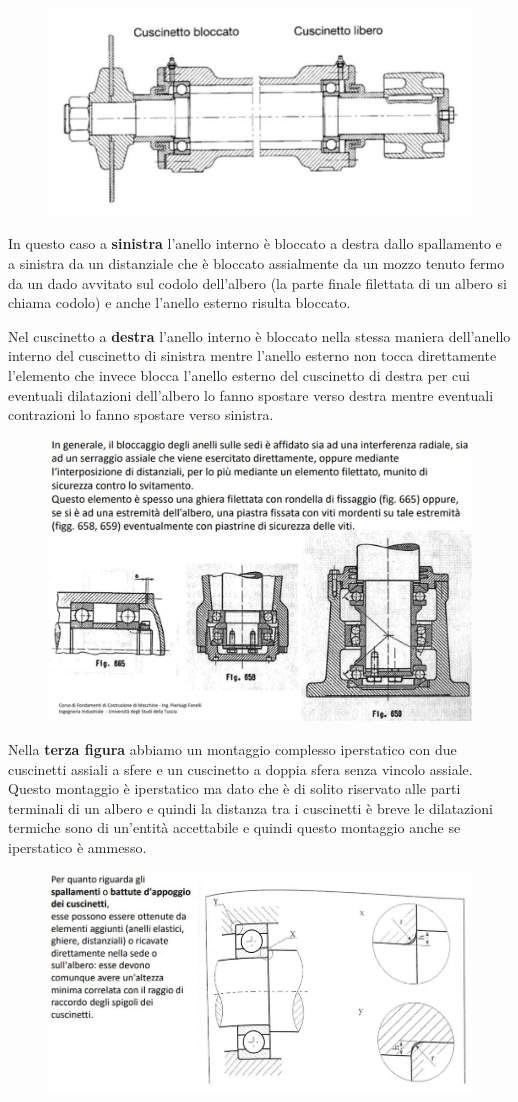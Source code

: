 \documentclass[a4paper, 15pt]{article}
\begin{document}
			\begin{figure}[H]
				\centering
				\includegraphics[width=0.5\linewidth]{immagini/screenshot010}
				\label{fig:screenshot010}
			\end{figure}
			In questo caso a \textbf{sinistra} l’anello interno è bloccato a destra dallo spallamento e a sinistra da un distanziale che è bloccato assialmente da un mozzo tenuto fermo da un dado avvitato sul codolo dell’albero (la parte finale filettata di un albero si chiama codolo) e anche l’anello esterno risulta bloccato.
			
			Nel cuscinetto a \textbf{destra} l’anello interno è bloccato nella stessa maniera dell’anello interno del cuscinetto di sinistra mentre l’anello esterno non tocca direttamente l’elemento che invece blocca l’anello esterno del cuscinetto di destra per cui eventuali dilatazioni dell’albero lo fanno spostare verso destra mentre eventuali contrazioni lo fanno spostare verso sinistra.
			\newpage
			\begin{figure}[H]
				\centering
				\includegraphics[width=0.5\linewidth]{immagini/screenshot011}
				\label{fig:screenshot011}
			\end{figure}
			Nella \textbf{terza figura} abbiamo un montaggio complesso iperstatico con due cuscinetti assiali a sfere e un cuscinetto a doppia sfera senza vincolo assiale. Questo montaggio è iperstatico ma dato che è di solito riservato alle parti terminali di un albero e quindi la distanza tra i cuscinetti è breve le dilatazioni termiche sono di un’entità accettabile e quindi questo montaggio anche se iperstatico è ammesso.
			\begin{figure}[H]
				\centering
				\includegraphics[width=0.5\linewidth]{immagini/screenshot012}
				\label{fig:screenshot012}
			\end{figure}
			
\end{document}
